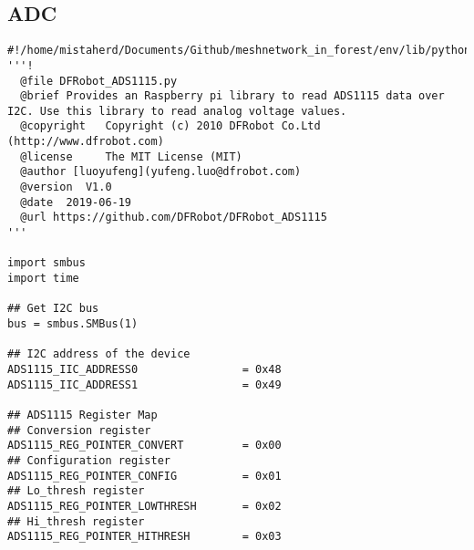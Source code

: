 \subsection{ADC}
\begin{lstlisting}[style=mystyle,caption={Code for ADC }]
    #!/home/mistaherd/Documents/Github/meshnetwork_in_forest/env/lib/python3.11
'''!
  @file DFRobot_ADS1115.py
  @brief Provides an Raspberry pi library to read ADS1115 data over I2C. Use this library to read analog voltage values.
  @copyright   Copyright (c) 2010 DFRobot Co.Ltd (http://www.dfrobot.com)
  @license     The MIT License (MIT)
  @author [luoyufeng](yufeng.luo@dfrobot.com)
  @version  V1.0
  @date  2019-06-19
  @url https://github.com/DFRobot/DFRobot_ADS1115
'''

import smbus
import time

## Get I2C bus
bus = smbus.SMBus(1)

## I2C address of the device
ADS1115_IIC_ADDRESS0				= 0x48
ADS1115_IIC_ADDRESS1				= 0x49

## ADS1115 Register Map
## Conversion register
ADS1115_REG_POINTER_CONVERT			= 0x00 
## Configuration register
ADS1115_REG_POINTER_CONFIG			= 0x01 
## Lo_thresh register
ADS1115_REG_POINTER_LOWTHRESH		= 0x02 
## Hi_thresh register
ADS1115_REG_POINTER_HITHRESH		= 0x03 


\end{lstlisting}

